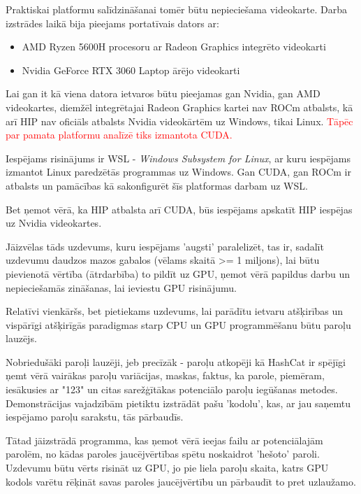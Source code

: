 \documentclass[12pt]{report}%
\theoremstyle{definition}
\begin{document}
Praktiskai platformu salīdzināšanai tomēr būtu nepieciešama videokarte.
Darba izstrādes laikā bija pieejams portatīvais dators ar:
\begin{itemize}
  \item AMD Ryzen 5600H procesoru ar Radeon Graphics integrēto videokarti
  \item Nvidia GeForce RTX 3060 Laptop ārējo videokarti
\end{itemize}

Lai gan it kā viena datora ietvaros būtu pieejamas gan Nvidia, gan AMD videokartes, diemžēl
integrētajai Radeon Graphics kartei nav ROCm atbalsts, kā arī HIP nav oficiāls atbalsts 
Nvidia videokārtēm uz Windows, tikai Linux. \textcolor{red}{Tāpēc par pamata platformu analīzē tiks izmantota CUDA.}

Iespējams risinājums ir WSL - \textit{Windows Subsystem for Linux}, ar kuru iespējams izmantot
Linux paredzētās programmas uz Windows. Gan CUDA, gan ROCm ir atbalsts un pamācības kā sakonfigurēt 
šīs platformas darbam uz WSL.\cite{nvidia_wsl_guide,rocm_wsl_guide}







Bet ņemot vērā, ka HIP atbalsta arī CUDA, būs iespējams apskatīt HIP iespējas uz Nvidia videokartes.

Jāizvēlas tāds uzdevums, kuru iespējams 'augsti' paralelizēt, tas ir, sadalīt uzdevumu daudzos mazos gabalos (vēlams skaitā >= 1 miljons),
lai būtu pievienotā vērtība (ātrdarbība) to pildīt uz GPU, ņemot vērā papildus darbu un nepieciešamās zināšanas, lai ieviestu GPU risinājumu.

Relatīvi vienkāršs, bet pietiekams uzdevums, lai parādītu ietvaru atšķirības un vispārīgi atšķirīgās
paradigmas starp CPU un GPU programmēšanu būtu paroļu lauzējs.

Nobriedušāki paroļi lauzēji, jeb precīzāk - paroļu atkopēji kā HashCat ir spējīgi ņemt vērā vairākas paroļu
variācijas, maskas, faktus, ka parole, piemēram, iesākusies ar "123" un citas sarežģītākas potenciālo paroļu
iegūšanas metodes. Demonstrācijas vajadzībām pietiktu izstrādāt pašu 'kodolu', kas, ar jau saņemtu
iespējamo paroļu sarakstu, tās pārbaudīs.


Tātad jāizstrādā programma, kas ņemot vērā ieejas failu ar potenciālajām parolēm, no kādas paroles
jaucējvērtības spētu noskaidrot 'hešoto' paroli.
Uzdevumu būtu vērts risināt uz GPU, jo pie liela paroļu skaita, katrs GPU kodols varētu rēķināt savas
paroles jaucējvērtību un pārbaudīt to pret uzlaužamo.
\end{document}
